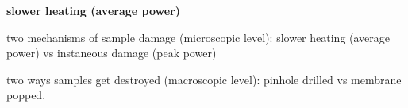 \textbf{slower heating (average power)}

two mechanisms of sample damage (microscopic level): slower heating (average power) vs instaneous damage (peak power)

two ways samples get destroyed (macroscopic level): pinhole drilled vs membrane popped.

%
%
%
